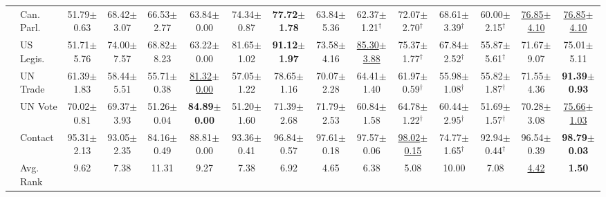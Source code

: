 \begin{table}[t]
{\begin{tabular}{llccccccccccccc}
 & Can. Parl. & 51.79{\scriptsize$\pm$0.63} & 68.42{\scriptsize$\pm$3.07} & 66.53{\scriptsize$\pm$2.77} & 63.84{\scriptsize$\pm$0.00} & 74.34{\scriptsize$\pm$0.87} & \textbf{77.72{\scriptsize$\pm$1.78}} & 63.84{\scriptsize$\pm$5.36} & 62.37{\scriptsize$\pm$1.21}$^\dagger$ & 72.07{\scriptsize$\pm$2.70}$^\dagger$ & 68.61{\scriptsize$\pm$3.39}$^\dagger$ & 60.00{\scriptsize$\pm$2.15}$^\dagger$ & \underline{76.85{\scriptsize$\pm$4.10}} & \underline{76.85{\scriptsize$\pm$4.10}} \\
 & US Legis. & 51.71{\scriptsize$\pm$5.76} & 74.00{\scriptsize$\pm$7.57} & 68.82{\scriptsize$\pm$8.23} & 63.22{\scriptsize$\pm$0.00} & 81.65{\scriptsize$\pm$1.02} & \textbf{91.12{\scriptsize$\pm$1.97}} & 73.58{\scriptsize$\pm$4.16} & \underline{85.30{\scriptsize$\pm$3.88}} & 75.37{\scriptsize$\pm$1.77}$^\dagger$ & 67.84{\scriptsize$\pm$2.52}$^\dagger$ & 55.87{\scriptsize$\pm$5.61}$^\dagger$ & 71.67{\scriptsize$\pm$9.07} & 75.01{\scriptsize$\pm$5.11} \\
 & UN Trade & 61.39{\scriptsize$\pm$1.83} & 58.44{\scriptsize$\pm$5.51} & 55.71{\scriptsize$\pm$0.38} & \underline{81.32{\scriptsize$\pm$0.00}} & 57.05{\scriptsize$\pm$1.22} & 78.65{\scriptsize$\pm$1.16} & 70.07{\scriptsize$\pm$2.28} & 64.41{\scriptsize$\pm$1.40} & 61.97{\scriptsize$\pm$0.59}$^\dagger$ & 55.98{\scriptsize$\pm$1.08}$^\dagger$ & 55.82{\scriptsize$\pm$1.87}$^\dagger$ & 71.55{\scriptsize$\pm$4.36} & \textbf{91.39{\scriptsize$\pm$0.93}} \\
 & UN Vote & 70.02{\scriptsize$\pm$0.81} & 69.37{\scriptsize$\pm$3.93} & 51.26{\scriptsize$\pm$0.04} & \textbf{84.89{\scriptsize$\pm$0.00}} & 51.20{\scriptsize$\pm$1.60} & 71.39{\scriptsize$\pm$2.68} & 71.79{\scriptsize$\pm$2.53} & 60.84{\scriptsize$\pm$1.58} & 64.78{\scriptsize$\pm$1.22}$^\dagger$ & 60.44{\scriptsize$\pm$2.95}$^\dagger$ & 51.69{\scriptsize$\pm$1.57}$^\dagger$ & 70.28{\scriptsize$\pm$3.08} & \underline{75.66{\scriptsize$\pm$1.03}} \\
 & Contact & 95.31{\scriptsize$\pm$2.13} & 93.05{\scriptsize$\pm$2.35} & 84.16{\scriptsize$\pm$0.49} & 88.81{\scriptsize$\pm$0.00} & 93.36{\scriptsize$\pm$0.41} & 96.84{\scriptsize$\pm$0.57} & 97.61{\scriptsize$\pm$0.18} & 97.57{\scriptsize$\pm$0.06} & \underline{98.02{\scriptsize$\pm$0.15}} & 74.77{\scriptsize$\pm$1.65}$^\dagger$ & 92.94{\scriptsize$\pm$0.44}$^\dagger$ & 96.54{\scriptsize$\pm$0.39} & \textbf{98.79{\scriptsize$\pm$0.03}} \\
\cmidrule{2-15}
 & Avg. Rank & 9.62 & 7.38 & 11.31 & 9.27 & 7.38 & 6.92 & 4.65 & 6.38 & 5.08 & 10.00 & 7.08 & \underline{4.42} & \textbf{1.50} \\

\end{tabular}}
\end{table}
